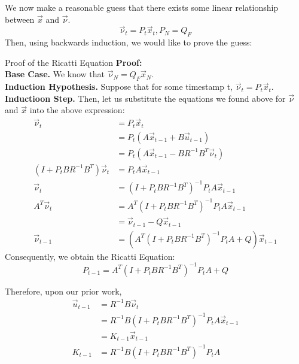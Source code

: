 We now make a reasonable guess that there exists some linear relationship between $\vec{x}$ and $\vec{\nu}$.
\[
    \vec{\nu}_t = P_t \vec{x}_t, P_N = Q_F
\]
Then, using backwards induction, we would like to prove the guess:
\begin{ln-explain}{Proof of the Ricatti Equation}{}
    \textbf{Proof:} \\
    \textbf{Base Case.} We know that $\vec{\nu}_N = Q_F \vec{x}_N$. \\
    \textbf{Induction Hypothesis.} Suppose that for some timestamp t, $\vec{\nu}_t = P_t \vec{x}_t$. \\
    \textbf{Inductioon Step.} Then, let us substitute the equations we found above for $\vec{\nu}$ and $\vec{x}$ into the above expression:
    \begin{align*}
        \vec{\nu}_t &= P_t \vec{x}_t \\
        &= P_t (A \vec{x}_{t - 1} + B \vec{u}_{t - 1}) \\
        &= P_t (A \vec{x}_{t - 1} - B R^{-1} B^T \vec{\nu}_t) \\
        (I + P_t B R^{-1} B^T) \vec{\nu}_t &= P_t A \vec{x}_{t - 1} \\
        \vec{\nu}_t &= {(I + P_t B R^{-1} B^T)}^{-1} P_t A \vec{x}_{t - 1} \\
        A^T \vec{\nu}_t &= A^T {(I + P_t B R^{-1} B^T)}^{-1} P_t A \vec{x}_{t - 1} \\
        &= \vec{\nu}_{t - 1} - Q \vec{x}_{t - 1} \\
        \vec{\nu}_{t - 1} &= (A^T {(I + P_t B R^{-1} B^T)}^{-1} P_t A + Q) \vec{x}_{t - 1}
    \end{align*}
    \tcblower
    Consequently, we obtain the Ricatti Equation:
    \[
        P_{t - 1} = A^T {(I + P_t B R^{-1} B^T)}^{-1} P_t A + Q
    \]
\end{ln-explain}
Therefore, upon our prior work,
\begin{align*}
    \vec{u}_{t - 1}
    &= R^{-1} B \vec{\nu}_t \\
    &= R^{-1} B {(I + P_t B R^{-1} B^T)}^{-1} P_t A \vec{x}_{t - 1} \\
    &= K_{t - 1} \vec{x}_{t - 1} \\
    K_{t - 1} &= R^{-1} B {(I + P_t B R^{-1} B^T)}^{-1} P_t A
\end{align*}
